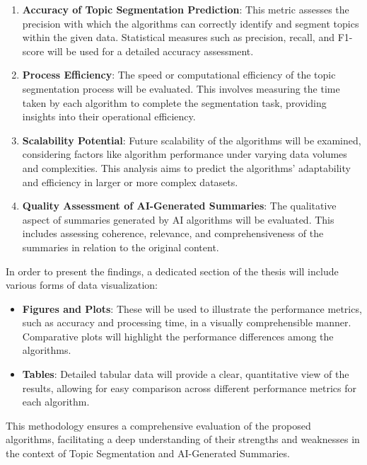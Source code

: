 \begin{enumerate}
    \item \textbf{Accuracy of Topic Segmentation Prediction}: This metric assesses the precision with which the algorithms can correctly identify and segment topics within the given data. Statistical measures such as precision, recall, and F1-score will be used for a detailed accuracy assessment.

    \item \textbf{Process Efficiency}: The speed or computational efficiency of the topic segmentation process will be evaluated. This involves measuring the time taken by each algorithm to complete the segmentation task, providing insights into their operational efficiency.

    \item \textbf{Scalability Potential}: Future scalability of the algorithms will be examined, considering factors like algorithm performance under varying data volumes and complexities. This analysis aims to predict the algorithms' adaptability and efficiency in larger or more complex datasets.

    \item \textbf{Quality Assessment of AI-Generated Summaries}: The qualitative aspect of summaries generated by AI algorithms will be evaluated. This includes assessing coherence, relevance, and comprehensiveness of the summaries in relation to the original content.
\end{enumerate}

In order to present the findings, a dedicated section of the thesis will include various forms of data visualization:

\begin{itemize}
    \item \textbf{Figures and Plots}: These will be used to illustrate the performance metrics, such as accuracy and processing time, in a visually comprehensible manner. Comparative plots will highlight the performance differences among the algorithms.

    \item \textbf{Tables}: Detailed tabular data will provide a clear, quantitative view of the results, allowing for easy comparison across different performance metrics for each algorithm.
\end{itemize}

This methodology ensures a comprehensive evaluation of the proposed algorithms, facilitating a deep understanding of their strengths and weaknesses in the context of Topic Segmentation and AI-Generated Summaries.

